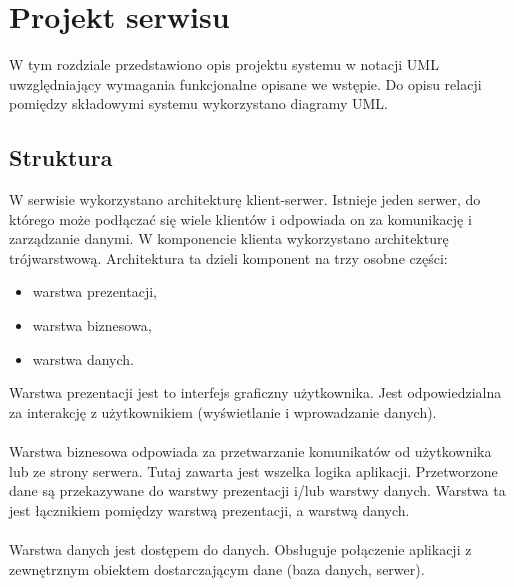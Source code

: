 \chapter{Projekt serwisu}
\thispagestyle{chapterBeginStyle}

W tym rozdziale przedstawiono opis projektu systemu w notacji UML uwzględniający wymagania funkcjonalne opisane we wstępie. Do opisu relacji pomiędzy składowymi systemu wykorzystano diagramy UML.

\section{Struktura}

W serwisie wykorzystano architekturę klient-serwer. Istnieje jeden serwer, do którego może podłączać się wiele klientów i odpowiada on za komunikację i zarządzanie danymi.
W komponencie klienta wykorzystano architekturę trójwarstwową. Architektura ta dzieli komponent na trzy osobne części:
\begin{itemize}
	\item warstwa prezentacji,
	\item warstwa biznesowa,
	\item warstwa danych.
\end{itemize}
Warstwa prezentacji jest to interfejs graficzny użytkownika. Jest odpowiedzialna za interakcję z użytkownikiem (wyświetlanie i wprowadzanie danych). \\ \\
Warstwa biznesowa odpowiada za przetwarzanie komunikatów od użytkownika lub ze strony serwera. Tutaj zawarta jest wszelka logika aplikacji. Przetworzone dane są przekazywane do warstwy prezentacji i/lub warstwy danych. Warstwa ta jest łącznikiem pomiędzy warstwą prezentacji, a warstwą danych. \\ \\
Warstwa danych jest dostępem do danych. Obsługuje połączenie aplikacji z zewnętrznym obiektem dostarczającym dane (baza danych, serwer). \\ \\ \\ \\ \\ \\ \\ \\ \\ \\ \\ \\ \\ 


